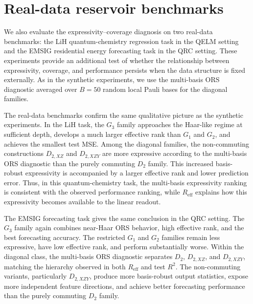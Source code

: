 \documentclass[
    aps,
    pre,
    amsmath,
    amssymb,
    reprint,
    superscriptaddress,
    preprintnumbers,
]{revtex4-2}
\begin{document}
\section{Real-data reservoir benchmarks}
\label{app:real-data-results}

We also evaluate the expressivity--coverage diagnosis on two real-data benchmarks: the LiH quantum-chemistry regression task in the QELM setting and the EMSIG residential energy forecasting task in the QRC setting. These experiments provide an additional test of whether the relationship between expressivity, coverage, and performance persists when the data structure is fixed externally. As in the synthetic experiments, we use the multi-basis ORS diagnostic averaged over $B=50$ random local Pauli bases for the diagonal families.

The real-data benchmarks confirm the same qualitative picture as the synthetic experiments. In the LiH task, the $G_3$ family approaches the Haar-like regime at sufficient depth, develops a much larger effective rank than $G_1$ and $G_2$, and achieves the smallest test MSE. Among the diagonal families, the non-commuting constructions $D_{2,XZ}$ and $D_{2,XZY}$ are more expressive according to the multi-basis ORS diagnostic than the purely commuting $D_2$ family. This increased basis-robust expressivity is accompanied by a larger effective rank and lower prediction error. Thus, in this quantum-chemistry task, the multi-basis expressivity ranking is consistent with the observed performance ranking, while $R_{\mathrm{eff}}$ explains how this expressivity becomes available to the linear readout.

The EMSIG forecasting task gives the same conclusion in the QRC setting. The $G_3$ family again combines near-Haar ORS behavior, high effective rank, and the best forecasting accuracy. The restricted $G_1$ and $G_2$ families remain less expressive, have low effective rank, and perform substantially worse. Within the diagonal class, the multi-basis ORS diagnostic separates $D_2$, $D_{2,XZ}$, and $D_{2,XZY}$, matching the hierarchy observed in both $R_{\mathrm{eff}}$ and test $R^2$. The non-commuting variants, particularly $D_{2,XZY}$, produce more basis-robust output statistics, expose more independent feature directions, and achieve better forecasting performance than the purely commuting $D_2$ family.
\end{document}
